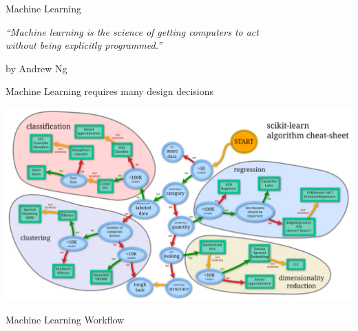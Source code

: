 \begin{frame}[c]{Machine Learning}

\centering
\textit{``Machine learning is the science of getting computers to act\\
 without being explicitly programmed.''}

\hfill by Andrew Ng

\end{frame}
\begin{frame}[c]{Machine Learning requires many design decisions}

\includegraphics[width=1.0\textwidth]{images/sklearn-cheat}

\end{frame}
\begin{frame}[c]{Machine Learning Workflow}

\centering


\pause
 
\bigskip
\bigskip
{}

\end{frame}

